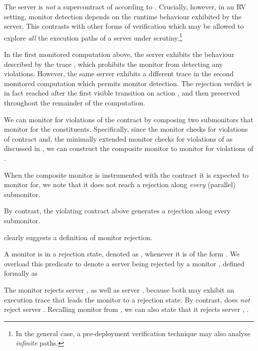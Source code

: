 \begin{example} \label{ex:monit-contract2}
  The server  is \emph{not} a supercontract of  according to .  Crucially, however, in an RV setting, monitor detection depends on the runtime behaviour exhibited by the server.  This contrasts with other forms of verification which may be allowed to explore \emph{all} the execution paths of a server under scrutiny.\footnote{In the general case, a pre-deployment verification technique may also analyse \emph{infinite} paths.}
  
  In the first monitored computation above, the server exhibits the behaviour described by the trace , which prohibits the monitor from detecting any violations. However, the same server exhibits a different trace  in the second monitored computation which permits monitor detection.  The rejection verdict is in fact reached after the first visible transition on action , and then preserved throughout the remainder of the computation. \exqed



\end{example}


\begin{example} \label{ex:monit-contract-plus}
  We can monitor for violations of the contract  by composing two submonitors that monitor for the constituents.  Specifically, since the monitor  checks for violations of contract  and, the minimally extended monitor  checks for violations of  as discussed in , we can construct the composite monitor  to monitor for violations of .  
  
  When the composite monitor is instrumented with the contract it is expected to monitor for, we note that it does not reach a rejection along \emph{every} (parallel) submonitor.  
  
  By contrast, the violating contract above generates a rejection along every submonitor. \exqed 
\end{example}

  clearly suggests a definition of monitor rejection.

\begin{definition}[Rejection] \label{def:rej} A monitor  is in a rejection state, denoted as \rej{\mV}, whenever it is of the form .  We overload this predicate to denote a server  being rejected by a monitor , defined formally as  
	
\end{definition}


\begin{example} \label{ex:monit-rej}  The monitor   rejects server ,  as well as server ,  because both may exhibit an execution trace that leads the monitor to a rejection state.  By contrast,   does \emph{not} reject server . Recalling monitor  from , we can also state that it rejects server , . \exqed
\end{example}







